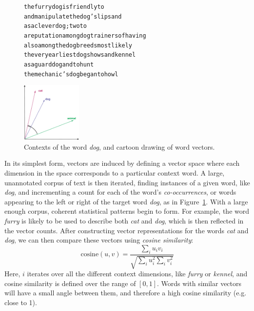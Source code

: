\documentclass[12pt]{article}
\begin{document}
\begin{figure}
\centering
\begin{minipage}{7cm}
\begin{scriptsize}
\begin{alltt}
         the furry {dog} is friendly to
and manipulate the {dog} 's lips and
       as a clever {dog} ; two to
a reputation among {dog} trainers of having
    also among the {dog} breeds most likely
 the very earliest {dog} shows and kennel
        as a guard {dog} and to hunt
   the mechanic 's {dog} began to howl
\end{alltt}
\end{scriptsize}
\end{minipage}\qquad
\begin{minipage}{3cm}
\includegraphics[width=3cm]{figures/vsm}
\end{minipage}
\caption{Contexts of the word {\em dog}, and cartoon drawing
of word vectors.}
\label{fig:vsm}
\end{figure}

In its simplest form, vectors are induced by defining a vector space where
each dimension in the space corresponds to a particular context word. A large,
unannotated corpus of text is then iterated, finding instances of a given word,
like {\em dog}, and incrementing a count for each of the word's {\em
co-occurrences}, or words appearing to the left or right of the target word
{\em dog}, as in Figure~\ref{fig:vsm}. With a large enough corpus, coherent
statistical patterns begin to form. For example, the word {\em furry} is likely
to be used to describe both {\em cat} and {\em dog}, which is then reflected in
the vector counts. After constructing vector representations for the words {\em
cat} and {\em dog}, we can then compare these vectors using {\em cosine
similarity}:
\begin{equation*}
  \text{cosine}(u, v) = \frac{\sum_i u_iv_i}{\sqrt{\sum_i u_i^2 \sum_i v_i^2}}
\end{equation*}
Here, $i$ iterates over all the different context dimensions, like {\em furry}
or {\em kennel}, and cosine similarity is defined over the range of $[0, 1]$.
Words with similar vectors will have a small angle between them, and therefore
a high cosine similarity (e.g. close to 1).
\end{document}
